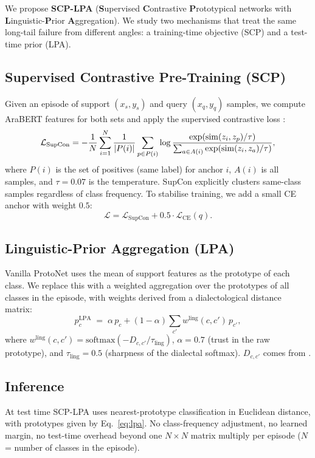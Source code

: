 \documentclass[11pt,a4paper,twocolumn]{article}
\begin{document}
We propose \textbf{SCP-LPA} (\textbf{S}upervised \textbf{C}ontrastive
\textbf{P}rototypical networks with \textbf{L}inguistic-\textbf{P}rior
\textbf{A}ggregation). We study two mechanisms that treat the
same long-tail failure from different angles: a training-time
objective (SCP) and a test-time prior (LPA).

\subsection{Supervised Contrastive Pre-Training (SCP)}
\label{sec:scp}
Given an episode of support $(x_s, y_s)$ and query $(x_q, y_q)$
samples, we compute AraBERT features for both sets and apply
the supervised contrastive loss \citep{Khosla2020}:
\begin{equation}
\small
\mathcal{L}_{\text{SupCon}} = -\frac{1}{N}\sum_{i=1}^N
  \frac{1}{|P(i)|}\sum_{p\in P(i)}
  \log\frac{\exp(\mathrm{sim}(z_i,z_p)/\tau)}{\sum_{a\in A(i)}\exp(\mathrm{sim}(z_i,z_a)/\tau)},
\label{eq:supcon}
\end{equation}
where $P(i)$ is the set of positives (same label) for anchor $i$,
$A(i)$ is all samples, and $\tau{=}0.07$ is the temperature.
SupCon explicitly clusters same-class samples regardless of
class frequency. To stabilise training, we add a small CE
anchor with weight $0.5$:
\begin{equation}
\mathcal{L} = \mathcal{L}_{\text{SupCon}} + 0.5 \cdot \mathcal{L}_{\text{CE}}(q).
\label{eq:total}
\end{equation}

\subsection{Linguistic-Prior Aggregation (LPA)}
\label{sec:lpa}
Vanilla ProtoNet uses the mean of support features as the
prototype of each class. We replace this with a weighted
aggregation over the prototypes of all classes in the episode,
with weights derived from a dialectological distance matrix:
\begin{equation}
p_c^{\text{LPA}} \;=\; \alpha\, p_c + (1-\alpha) \sum_{c'} w^{\text{ling}}(c, c')\, p_{c'},
\label{eq:lpa}
\end{equation}
where $w^{\text{ling}}(c, c') = \mathrm{softmax}(-D_{c,c'}/\tau_{\text{ling}})$,
$\alpha=0.7$ (trust in the raw prototype), and $\tau_{\text{ling}}=0.5$
(sharpness of the dialectal softmax). $D_{c,c'}$ comes from
\citet{Versteegh2006,Habash2010}.

\subsection{Inference}
\label{sec:inference}
At test time SCP-LPA uses nearest-prototype classification in
Euclidean distance, with prototypes given by Eq.~\ref{eq:lpa}.
No class-frequency adjustment, no learned margin, no test-time
overhead beyond one $N{\times}N$ matrix multiply per episode
($N$ = number of classes in the episode).
\end{document}
